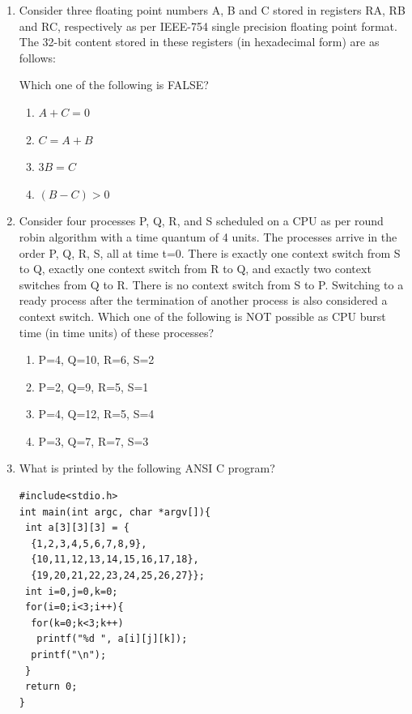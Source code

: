 \begin{enumerate}
\hfill{}

\item Consider three floating point numbers A, B and C stored in registers RA, RB and RC, respectively as per IEEE-754 single precision floating point format. The 32-bit content stored in these registers (in hexadecimal form) are as follows:  

 

Which one of the following is FALSE?  

\begin{enumerate}
\item $A+C=0$
\item $C=A+B$
\item $3B=C$
\item $(B-C) > 0$
\end{enumerate}

\hfill{}

\item Consider four processes P, Q, R, and S scheduled on a CPU as per round robin algorithm with a time quantum of 4 units. The processes arrive in the order P, Q, R, S, all at time t=0. There is exactly one context switch from S to Q, exactly one context switch from R to Q, and exactly two context switches from Q to R. There is no context switch from S to P. Switching to a ready process after the termination of another process is also considered a context switch. Which one of the following is NOT possible as CPU burst time (in time units) of these processes?  

\begin{enumerate}
\item P=4, Q=10, R=6, S=2
\item P=2, Q=9, R=5, S=1
\item P=4, Q=12, R=5, S=4
\item P=3, Q=7, R=7, S=3
\end{enumerate}

\hfill{}

\item What is printed by the following ANSI C program?  

\begin{verbatim}
#include<stdio.h>
int main(int argc, char *argv[]){
 int a[3][3][3] = {
  {1,2,3,4,5,6,7,8,9},
  {10,11,12,13,14,15,16,17,18},
  {19,20,21,22,23,24,25,26,27}};
 int i=0,j=0,k=0;
 for(i=0;i<3;i++){
  for(k=0;k<3;k++)
   printf("%d ", a[i][j][k]);
  printf("\n");
 }
 return 0;
}
\end{verbatim}


\end{enumerate}
